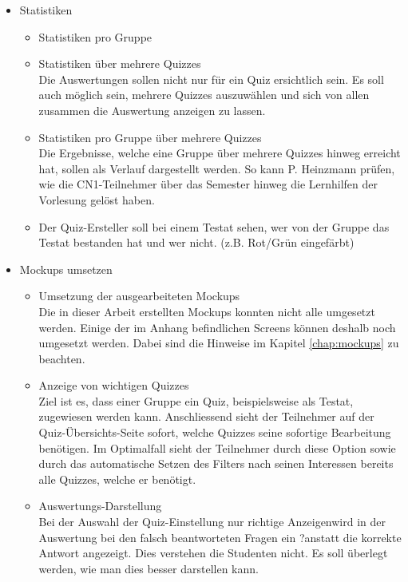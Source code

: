 \begin{itemize}
	
	\item Statistiken
	\begin{itemize}
		\item Statistiken pro Gruppe
		\item Statistiken über mehrere Quizzes \\
		Die Auswertungen sollen nicht nur für ein Quiz ersichtlich sein. Es soll auch möglich sein, mehrere Quizzes auszuwählen und sich von allen zusammen die Auswertung anzeigen zu lassen.
		\item Statistiken pro Gruppe über mehrere Quizzes \\
		Die Ergebnisse, welche eine Gruppe über mehrere Quizzes hinweg erreicht hat, sollen als Verlauf dargestellt werden. So kann P. Heinzmann prüfen, wie die CN1-Teilnehmer über das Semester hinweg die Lernhilfen der Vorlesung gelöst haben.
		\item Der Quiz-Ersteller soll bei einem Testat sehen, wer von der Gruppe das Testat bestanden hat und wer nicht. (z.B. Rot/Grün eingefärbt)
	\end{itemize}
	
	
	\item Mockups umsetzen \\
	\begin{itemize}
		\item Umsetzung der ausgearbeiteten Mockups\\
		Die in dieser Arbeit erstellten Mockups konnten nicht alle umgesetzt werden. Einige der im Anhang befindlichen Screens können deshalb noch umgesetzt werden. Dabei sind die Hinweise im Kapitel \ref{chap:mockups} zu beachten.
		
		\item Anzeige von wichtigen Quizzes \\
		Ziel ist es, dass einer Gruppe ein Quiz, beispielsweise als Testat, zugewiesen werden kann. Anschliessend sieht der Teilnehmer auf der Quiz-Übersichts-Seite sofort, welche Quizzes seine sofortige Bearbeitung benötigen.
		Im Optimalfall sieht der Teilnehmer durch diese Option sowie durch das automatische Setzen des Filters nach seinen Interessen bereits alle Quizzes, welche er benötigt.
		
		\item Auswertungs-Darstellung \\
		Bei der Auswahl der Quiz-Einstellung \glqq nur richtige Anzeigen\grqq wird in der Auswertung bei den falsch beantworteten Fragen ein \glqq ?\grqq anstatt die korrekte Antwort angezeigt. Dies verstehen die Studenten nicht. Es soll überlegt werden, wie man dies besser darstellen kann.
		

\end{itemize}
\end{itemize}

